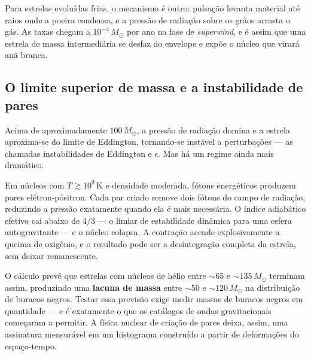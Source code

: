 \documentclass[11pt,a4paper]{article}
\begin{document}
Para estrelas evoluídas frias, o mecanismo é outro: pulsação levanta material até raios onde a poeira condensa, e a pressão de radiação sobre os grãos arrasta o gás. As taxas chegam a $10^{-4}\,M_\odot$ por ano na fase de \textit{superwind}, e é assim que uma estrela de massa intermediária se desfaz do envelope e expõe o núcleo que virará anã branca.

\subsection*{O limite superior de massa e a instabilidade de pares}

Acima de aproximadamente $100\,M_\odot$, a pressão de radiação domina e a estrela aproxima-se do limite de Eddington, tornando-se instável a perturbações --- as chamadas instabilidades de Eddington e $\epsilon$. Mas há um regime ainda mais dramático.

Em núcleos com $T\gtrsim10^{9}\,\mathrm{K}$ e densidade moderada, fótons energéticos produzem pares elétron-pósitron. Cada par criado remove dois fótons do campo de radiação, reduzindo a pressão exatamente quando ela é mais necessária. O índice adiabático efetivo cai abaixo de $4/3$ --- o limiar de estabilidade dinâmica para uma esfera autogravitante --- e o núcleo colapsa. A contração acende explosivamente a queima de oxigênio, e o resultado pode ser a desintegração completa da estrela, sem deixar remanescente.

O cálculo prevê que estrelas com núcleos de hélio entre $\sim65$ e $\sim135\,M_\odot$ terminam assim, produzindo uma \textbf{lacuna de massa} entre $\sim50$ e $\sim120\,M_\odot$ na distribuição de buracos negros. Testar essa previsão exige medir massas de buracos negros em quantidade --- e é exatamente o que os catálogos de ondas gravitacionais começaram a permitir. A física nuclear de criação de pares deixa, assim, uma assinatura mensurável em um histograma construído a partir de deformações do espaço-tempo.
\end{document}
